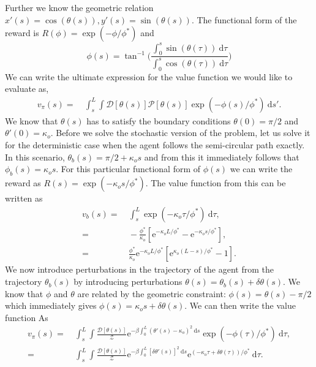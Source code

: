 \documentclass[12pt]{article}
\def\d{\text{d}}
\def\e{\text{e}}
\def\P{\mathcal{P}}
\def\D{\mathcal{D}}
\begin{document}
Further we know the geometric relation $x'(s) = \cos(\theta(s)), y'(s) = \sin(\theta(s))$. The functional
form of the reward is $R(\phi) = \exp(-\phi/\phi^*)$ and 
\[
    \phi(s) = \tan^{-1}\bigg( \frac{\int_0^s \sin(\theta(\tau)) \ \d \tau}{\int_0^s \cos(\theta(\tau)) \ \d \tau} \bigg)
\]
We can write the ultimate expression for the value function we would like to evaluate as,
\begin{align}
    v_\pi(s) =& \ \int_{s}^L \int \D[\theta(s)] \P[\theta(s)] \exp(-\phi(s)/\phi^*) \ \d s'.
\end{align}
We know that $\theta(s)$ has to satisfy the boundary conditions $\theta(0) = \pi/2$ and $\theta'(0) = \kappa_o$.
Before we solve the stochastic version of the problem, let us solve it for the deterministic case when
the agent follows the semi-circular path exactly. In this scenario, $\theta_b(s) = \pi/2 + \kappa_o s$ and
from this it immediately follows that $\phi_b(s) = \kappa_o s$. For this particular functional form of $\phi(s)$
we can write the reward as $R(s) = \exp(-\kappa_o s/\phi^*)$. The value function from this can be written as
\begin{align}
    v_b(s) =& \ \int_s^L \exp(-\kappa_o \tau/\phi^*) \ \d \tau, \\
    =& \ -\frac{\phi^*}{\kappa_o} [\e^{-\kappa_o L/\phi^*} - \e^{-\kappa_o s/\phi^*}], \\
    =& \ \frac{\phi^*}{\kappa_o} \e^{-\kappa_o L/\phi^*} [ \e^{\kappa_o(L-s)/\phi^*} - 1].
\end{align}
We now introduce perturbations in the trajectory of the agent from the trajectory $\theta_b(s)$ by introducing
perturbations $\theta(s) = \theta_b(s) + \delta \theta(s)$. We know that $\phi$ and $\theta$ are related by the
geometric constraint: $\phi(s) = \theta(s) - \pi/2$ which immediately gives $\phi(s) = \kappa_o s + \delta \theta(s)$.
We can then write the value function As
\begin{align}
    v_\pi(s) =& \ \int_{s}^L \int \frac{ \D[\theta(s)]}{\mathcal{Z}}\e^{-\beta \int_0^L (\theta'(s)-\kappa_o)^2 \ \d s} \exp(-\phi(\tau)/\phi^*) \ \d \tau, \\
    =& \ \int_{s}^L \int \frac{ \D[\theta(s)]}{\mathcal{Z}}\e^{-\beta \int_0^L [\delta \theta'(s)]^2 \ \d s} \e^{(-\kappa_o \tau + \delta \theta(\tau))/\phi^*} \ \d \tau.
\end{align}
\end{document}
